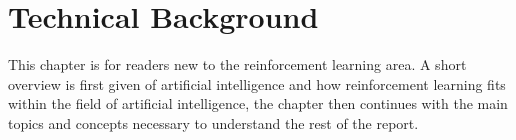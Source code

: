 \chapter{Technical Background}
This chapter is for readers new to the reinforcement learning area. A short overview is first given of artificial intelligence and how reinforcement learning fits within the field of artificial intelligence, the chapter then continues with the main topics and concepts necessary to understand the rest of the report. 












